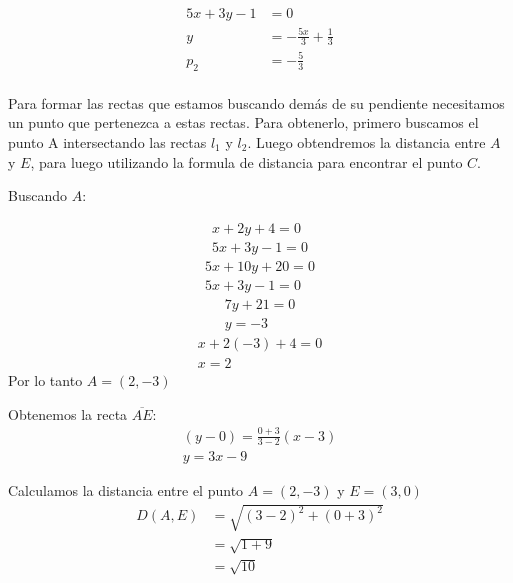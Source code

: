 \documentclass[a4paper,10pt]{article}
\newcommand{\dis}{\displaystyle}
\begin{document}
\begin{enumerate}
\begin{minipage}{.4\textwidth}
\end{minipage}%
\begin{minipage}{.4\textwidth}

\begin{align*}
 \dis  5x+3y-1  &= 0\\
 \dis  y  &= -\frac{5x}{3}+\frac{1}{3}\\
 \dis  p_2 &= -\frac{5}{3}\\
\end{align*}

\end{minipage}

Para formar las rectas que estamos buscando demás de su pendiente necesitamos un punto que pertenezca a estas rectas. Para obtenerlo, primero buscamos el punto A intersectando las rectas $l_1$ y $l_2$. Luego obtendremos la distancia entre $A$
 y $E$, para luego utilizando la formula de distancia para encontrar el punto $C$.\\
 \vspace{5mm}
 
 Buscando $A$:
 
\begin{gather*}
x+2y+4 =  0\\
5x+3y-1 =  0
\end{gather*}
\begin{gather*}
5x+10y+20=  0 \\ 
5x+3y-1 =  0
\end{gather*}
\begin{gather*}
7y+21=  0 \\
y=-3
\end{gather*}
\begin{gather*}
x+2(-3)+4 =  0\\
x=2
\end{gather*}
Por lo tanto $A=(2,-3)$

 \vspace{5mm}
 
 
 Obtenemos la recta $\overline{AE}$:
 \begin{gather*}
(y-0)=\frac{0+3}{3-2}(x-3)\\
y=3x-9
\end{gather*}
 
 
  \vspace{5mm}
 
 Calculamos la distancia entre el punto $A=(2,-3)$ y $E=(3,0)$
\begin{align*}
D(A,E) &= \sqrt{(3-2)^2+(0+3)^2}\\
&= \sqrt{1+9} \\
&= \sqrt{10}
\end{align*}


\end{enumerate}
\end{document}
